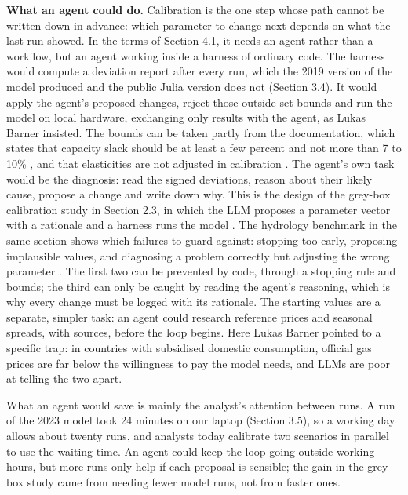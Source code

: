 \textbf{What an agent could do.} Calibration is the one step whose path cannot be written down in advance: which parameter to change next depends on what the last run showed.
In the terms of Section 4.1, it needs an agent rather than a workflow, but an agent working inside a harness of ordinary code.
The harness would compute a deviation report after every run, which the 2019 version of the model produced and the public Julia version does not (Section 3.4).
It would apply the agent's proposed changes, reject those outside set bounds and run the model on local hardware, exchanging only results with the agent, as Lukas Barner insisted.
The bounds can be taken partly from the documentation, which states that capacity slack should be at least a few percent and not more than 7 to 10\% \citep[p.~28]{egging2019global}, and that elasticities are not adjusted in calibration \citep[p.~26]{egging2019global}.
The agent's own task would be the diagnosis: read the signed deviations, reason about their likely cause, propose a change and write down why.
This is the design of the grey-box calibration study in Section 2.3, in which the LLM proposes a parameter vector with a rationale and a harness runs the model \citep{gomezguillen2026agentic}.
The hydrology benchmark in the same section shows which failures to guard against: stopping too early, proposing implausible values, and diagnosing a problem correctly but adjusting the wrong parameter \citep{li2026hydroagent}.
The first two can be prevented by code, through a stopping rule and bounds; the third can only be caught by reading the agent's reasoning, which is why every change must be logged with its rationale.
The starting values are a separate, simpler task: an agent could research reference prices and seasonal spreads, with sources, before the loop begins.
Here Lukas Barner pointed to a specific trap: in countries with subsidised domestic consumption, official gas prices are far below the willingness to pay the model needs, and LLMs are poor at telling the two apart.

What an agent would save is mainly the analyst's attention between runs.
A run of the 2023 model took 24 minutes on our laptop (Section 3.5), so a working day allows about twenty runs, and analysts today calibrate two scenarios in parallel to use the waiting time.
An agent could keep the loop going outside working hours, but more runs only help if each proposal is sensible; the gain in the grey-box study came from needing fewer model runs, not from faster ones.

